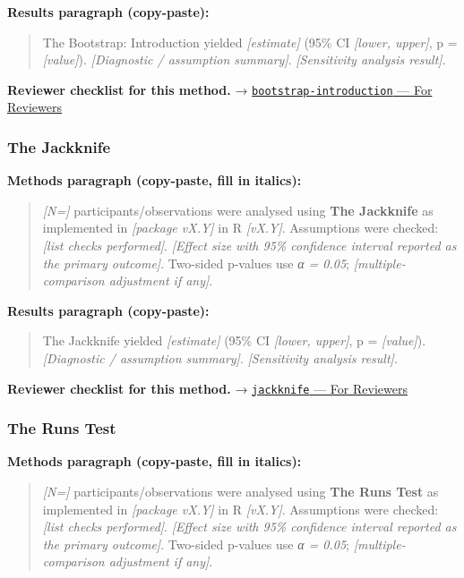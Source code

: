 \documentclass[
]{article}
\begin{document}
\textbf{Results paragraph (copy-paste):}

\begin{quote}
The Bootstrap: Introduction yielded \emph{{[}estimate{]}} (95\% CI
\emph{{[}lower, upper{]}}, p = \emph{{[}value{]}}). \emph{{[}Diagnostic
/ assumption summary{]}}. \emph{{[}Sensitivity analysis result{]}}.
\end{quote}

\textbf{Reviewer checklist for this method.} →
\href{../chapters/04-inferential/bootstrap-introduction.Rmd\#for-reviewers}{\texttt{bootstrap-introduction}
--- For Reviewers}

\subsubsection{The Jackknife}\label{the-jackknife}

\textbf{Methods paragraph (copy-paste, fill in italics):}

\begin{quote}
\emph{{[}N={]}} participants/observations were analysed using
\textbf{The Jackknife} as implemented in \emph{{[}package vX.Y{]}} in R
\emph{{[}vX.Y{]}}. Assumptions were checked: \emph{{[}list checks
performed{]}}. \emph{{[}Effect size with 95\% confidence interval
reported as the primary outcome{]}}. Two-sided p-values use \emph{α =
0.05}; \emph{{[}multiple-comparison adjustment if any{]}}.
\end{quote}

\textbf{Results paragraph (copy-paste):}

\begin{quote}
The Jackknife yielded \emph{{[}estimate{]}} (95\% CI \emph{{[}lower,
upper{]}}, p = \emph{{[}value{]}}). \emph{{[}Diagnostic / assumption
summary{]}}. \emph{{[}Sensitivity analysis result{]}}.
\end{quote}

\textbf{Reviewer checklist for this method.} →
\href{../chapters/04-inferential/jackknife.Rmd\#for-reviewers}{\texttt{jackknife}
--- For Reviewers}

\subsubsection{The Runs Test}\label{the-runs-test}

\textbf{Methods paragraph (copy-paste, fill in italics):}

\begin{quote}
\emph{{[}N={]}} participants/observations were analysed using
\textbf{The Runs Test} as implemented in \emph{{[}package vX.Y{]}} in R
\emph{{[}vX.Y{]}}. Assumptions were checked: \emph{{[}list checks
performed{]}}. \emph{{[}Effect size with 95\% confidence interval
reported as the primary outcome{]}}. Two-sided p-values use \emph{α =
0.05}; \emph{{[}multiple-comparison adjustment if any{]}}.
\end{quote}
\end{document}
